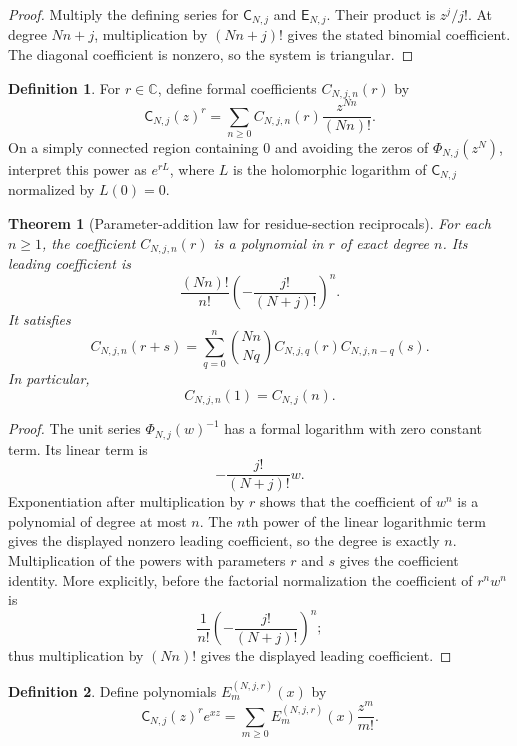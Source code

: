 \documentclass[11pt]{article}
\newtheorem{theorem}{Theorem}[section]
\theoremstyle{definition}
\newtheorem{definition}[definition]{Definition}
\theoremstyle{remark}
\newcommand{\CC}{\mathbb C}
\newcommand{\Efun}{\mathsf E}
\newcommand{\Cfun}{\mathsf C}
\begin{document}
\begin{proof}
Multiply the defining series for $\Cfun_{N,j}$ and $\Efun_{N,j}$.  Their product is $z^j/j!$.  At degree $Nn+j$, multiplication by $(Nn+j)!$ gives the stated binomial coefficient.  The diagonal coefficient is nonzero, so the system is triangular.
\end{proof}

\begin{definition}\label{def:residue_section_power}
For $r\in\CC$, define formal coefficients $C_{N,j,n}(r)$ by
\[
\Cfun_{N,j}(z)^r
=
\sum_{n\geq0}C_{N,j,n}(r)\frac{z^{Nn}}{(Nn)!}.
\]
On a simply connected region containing $0$ and avoiding the zeros of $\Phi_{N,j}(z^N)$, interpret this power as $e^{rL}$, where $L$ is the holomorphic logarithm of $\Cfun_{N,j}$ normalized by $L(0)=0$.
\end{definition}

\begin{theorem}[Parameter-addition law for residue-section reciprocals]\label{thm:residue_section_parameter_addition}
For each $n\geq1$, the coefficient $C_{N,j,n}(r)$ is a polynomial in $r$ of exact degree $n$.  Its leading coefficient is
\[
\frac{(Nn)!}{n!}
\left(-\frac{j!}{(N+j)!}\right)^n.
\]
It satisfies
\[
C_{N,j,n}(r+s)
=
\sum_{q=0}^{n}
\binom{Nn}{Nq}
C_{N,j,q}(r)C_{N,j,n-q}(s).
\]
In particular,
\[
C_{N,j,n}(1)=C_{N,j}(n).
\]
\end{theorem}

\begin{proof}
The unit series $\Phi_{N,j}(w)^{-1}$ has a formal logarithm with zero constant term.  Its linear term is
\[
-\frac{j!}{(N+j)!}w.
\]
Exponentiation after multiplication by $r$ shows that the coefficient of $w^n$ is a polynomial of degree at most $n$.  The $n$th power of the linear logarithmic term gives the displayed nonzero leading coefficient, so the degree is exactly $n$.  Multiplication of the powers with parameters $r$ and $s$ gives the coefficient identity.
More explicitly, before the factorial normalization the coefficient of
$r^nw^n$ is
\[
\frac1{n!}\left(-\frac{j!}{(N+j)!}\right)^n;
\]
thus multiplication by $(Nn)!$ gives the displayed leading coefficient.
\end{proof}

\begin{definition}\label{def:block_appell}
Define polynomials $E_m^{(N,j,r)}(x)$ by
\[
\Cfun_{N,j}(z)^re^{xz}
=
\sum_{m\geq0}E_m^{(N,j,r)}(x)\frac{z^m}{m!}.
\]
\end{definition}
\end{document}
